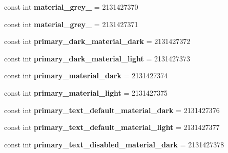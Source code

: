 \begin{DoxyCompactItemize}
const int {\bfseries material\+\_\+grey\+\_} = 2131427370
\item 
\mbox{\label{class_sample_app_1_1_droid_1_1_resource_1_1_color_aa35ea146a5abae562f4a44cbcf151a43}} 
const int {\bfseries material\+\_\+grey\+\_} = 2131427371
\item 
\mbox{\label{class_sample_app_1_1_droid_1_1_resource_1_1_color_a508f182a4becf48ef4f33b256ec7f7c1}} 
const int {\bfseries primary\+\_\+dark\+\_\+material\+\_\+dark} = 2131427372
\item 
\mbox{\label{class_sample_app_1_1_droid_1_1_resource_1_1_color_a456e4f2b69f36b90e128456d275b45a9}} 
const int {\bfseries primary\+\_\+dark\+\_\+material\+\_\+light} = 2131427373
\item 
\mbox{\label{class_sample_app_1_1_droid_1_1_resource_1_1_color_a9bc94ccdd3c42e12d79b5702749f46d8}} 
const int {\bfseries primary\+\_\+material\+\_\+dark} = 2131427374
\item 
\mbox{\label{class_sample_app_1_1_droid_1_1_resource_1_1_color_aedf38e5b44a58b847c46df75710fcc14}} 
const int {\bfseries primary\+\_\+material\+\_\+light} = 2131427375
\item 
\mbox{\label{class_sample_app_1_1_droid_1_1_resource_1_1_color_a7e68e54f739a966343009c8e25c0797e}} 
const int {\bfseries primary\+\_\+text\+\_\+default\+\_\+material\+\_\+dark} = 2131427376
\item 
\mbox{\label{class_sample_app_1_1_droid_1_1_resource_1_1_color_abf08b77dc8dcbd77b8c95a1a9568229d}} 
const int {\bfseries primary\+\_\+text\+\_\+default\+\_\+material\+\_\+light} = 2131427377
\item 
\mbox{\label{class_sample_app_1_1_droid_1_1_resource_1_1_color_a99a1151f3846766bb1d27a3b5c25a390}} 
const int {\bfseries primary\+\_\+text\+\_\+disabled\+\_\+material\+\_\+dark} = 2131427378

\end{DoxyCompactItemize}
